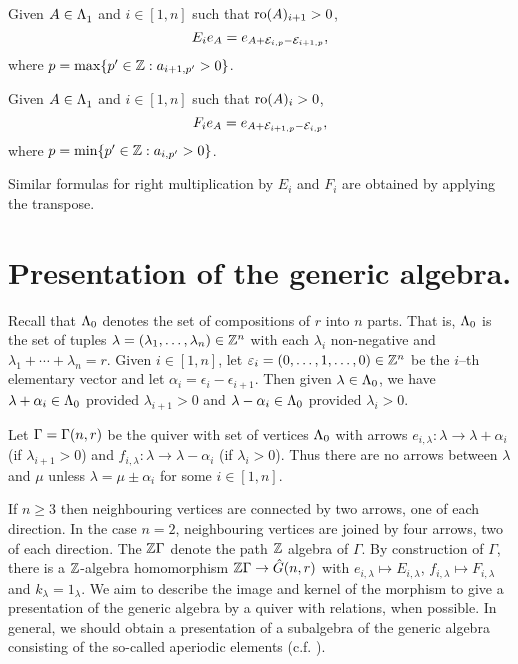 \documentclass[a4paper, 11pt]{report}
\begin{document}
\begin{lemma}\label{lemma:multiplication-rule-generic}
Given $A\in\Lambda_1^{}$ and $i\in[1,n]$ such that $\operatorname{ro}(A)_{i+1}>0$,
\begin{equation*}
E_ie_A = e_{A+\mathcal{E}_{i,p}-\mathcal{E}_{i+1,p}},
\end{equation*}
where $p=\max\{p'\in\mathbb{Z}: a_{i+1,p'}>0\}$.

Given $A\in\Lambda_1^{}$ and $i\in[1,n]$ such that $\operatorname{ro}(A)_i>0$,
\begin{equation*}
F_ie_A = e_{A+\mathcal{E}_{i+1,p}-\mathcal{E}_{i,p}},
\end{equation*}
where $p=\min\{p'\in\mathbb{Z}: a_{i,p'}>0\}$.
\end{lemma}

Similar formulas for right multiplication by $E_i$ and $F_i$ are obtained by applying the transpose.

\section{Presentation of the generic algebra.}

Recall that ${\Lambda_0}$ denotes the set of compositions of $r$ into $n$ parts. That is, ${\Lambda_0}$ is the set of tuples $\lambda = (\lambda_1,\ldots,\lambda_n)\in\mathbb{Z}^n$ with each $\lambda_i$ non-negative and $\lambda_1 +\cdots +\lambda_n = r$. Given $i\in [1,n]$, let $\varepsilon_i = (0,\ldots,1,\ldots,0)\in\mathbb{Z}^n$ be the $i$--th elementary vector and let $\alpha_i = \epsilon_i - \epsilon_{i+1}$. Then given $\lambda\in{\Lambda_0}$, we have $\lambda + \alpha_i\in{\Lambda_0}$ provided $\lambda_{i+1}>0$ and $\lambda - \alpha_i\in{\Lambda_0}$ provided $\lambda_i>0$.

Let $\Gamma =\Gamma(n,r)$ be the quiver with set of vertices ${\Lambda_0}$ with arrows $e_{i,\lambda}\colon\lambda\to\lambda +\alpha_i$ (if $\lambda_{i+1}>0$) and $f_{i,\lambda}\colon\lambda\to\lambda -\alpha_i$ (if $\lambda_i>0$). Thus there are no arrows between $\lambda$ and $\mu$ unless $\lambda = \mu\pm \alpha_i$ for some $i\in [1,n]$.

If $n\geq 3$ then neighbouring vertices are connected by two arrows, one of each direction. In the case $n=2$, neighbouring vertices are joined by four arrows, two of each direction. The $\mathbb{Z}\Gamma$ denote the path $\mathbb{Z}$ algebra of $\Gamma$. By construction of $\Gamma$, there is a $\mathbb{Z}$-algebra homomorphism $\mathbb{Z}\Gamma\to\hat{G}(n,r)$ with $e_{i,\lambda}\mapsto E_{i,\lambda}$, $f_{i,\lambda}\mapsto F_{i,\lambda}$ and $k_\lambda = 1_\lambda$. We aim to describe the image and kernel of the morphism to give a presentation of the generic algebra by a quiver with relations, when possible. In general, we should obtain a presentation of a subalgebra of the generic algebra consisting of the so-called aperiodic elements (c.f. \cite{lusztig99}).
\end{document}
